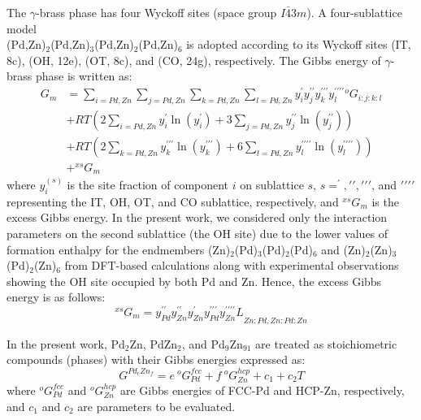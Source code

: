 The $\gamma$-brass phase has four Wyckoff sites (space group $I\bar{4}3m$). A four-sublattice model \\ (Pd,Zn)$_2$(Pd,Zn)$_3$(Pd,Zn)$_2$(Pd,Zn)$_6$ is adopted according to its Wyckoff sites (IT, 8c), (OH, 12e), (OT, 8c), and (CO, 24g), respectively. The Gibbs energy of $\gamma$-brass phase is written as: 
\begin{equation} \label{intermetallics:gammaG}
    \begin{aligned}
    G_m&=\sum_{i=Pd,Zn}\sum_{j=Pd,Zn}\sum_{k=Pd,Zn}\sum_{l=Pd,Zn}{y_i^\prime y_j^{\prime\prime}y_k^{\prime\prime\prime}y_l^{\prime\prime\prime\prime}{{^o}G}_{i:j:k:l}}\\&+RT\left(2\sum_{i=Pd,Zn}{y_i^{\prime}\ln{\left(y_i^{\prime}\right)}}+3\sum_{j=Pd,Zn}{y_j^{\prime\prime}\ln{\left(y_j^{\prime\prime}\right)}}\right)\\&+RT\left(2\sum_{k=Pd,Zn}{y_k^{\prime\prime\prime}\ln{\left(y_k^{\prime\prime\prime}\right)}}+6\sum_{l=Pd,Zn}{y_l^{\prime\prime\prime\prime}\ln{\left(y_l^{\prime\prime\prime\prime}\right)}}\right)\\&+{^{xs}}G_m
    \end{aligned}
\end{equation}
where $y_i^{(s)}$ is the site fraction of component $i$ on sublattice $s$, $s=^\prime, \prime\prime, \prime\prime\prime$, and $\prime\prime\prime\prime$ representing the IT, OH, OT, and CO sublattice, respectively, and ${^{xs}}G_m$ is the excess Gibbs energy. In the present work, we considered only the interaction parameters on the second sublattice (the OH site) due to the lower values of formation enthalpy for the endmembers (Zn)$_2$(Pd)$_3$(Pd)$_2$(Pd)$_6$ and (Zn)$_2$(Zn)$_3$(Pd)$_2$(Zn)$_6$ from DFT-based calculations along with experimental observations \cite{strom1969x, gourdon2006intergrowth} showing the OH site occupied by both Pd and Zn. Hence, the excess Gibbs energy is as follows:
\begin{equation} \label{intermetallics:gammaGex}
    {^{xs}}G_m=y_{Pd}^{\prime\prime}y_{Zn}^{\prime\prime}y_{Zn}^\prime y_{Pd}^{\prime\prime\prime}{y_{Zn}^{\prime\prime\prime\prime}L}_{Zn:Pd,Zn:Pd:Zn}
\end{equation}

In the present work, Pd$_2$Zn, PdZn$_2$, and Pd$_9$Zn$_{91}$ are treated as stoichiometric compounds (phases) with their Gibbs energies expressed as:
\begin{equation} \label{intermetallics:stoiG}
    G^{{Pd}_e{Zn}_f}=e\:{^o}G_{Pd}^{fcc}+f\:{^o}G_{Zn}^{hcp}+c_1+c_2T
\end{equation}
where ${^o}G_{Pd}^{fcc}$ and ${^o}G_{Zn}^{hcp}$ are Gibbs energies of FCC-Pd and HCP-Zn, respectively, and $c_1$ and $c_2$ are parameters to be evaluated.


